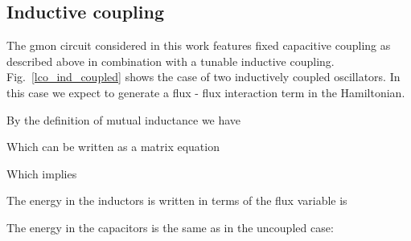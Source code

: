 \subsection{Inductive coupling}
The gmon circuit considered in this work features fixed capacitive coupling as described above in combination with a tunable inductive coupling.
Fig.~\ref{lco_ind_coupled} shows the case of two inductively coupled oscillators.
In this case we expect to generate a flux - flux interaction term in the Hamiltonian.

By the definition of mutual inductance we have

\noindent Which can be written as a matrix equation

Which implies

The energy in the inductors is written in terms of the flux variable is

The energy in the capacitors is the same as in the uncoupled case:

